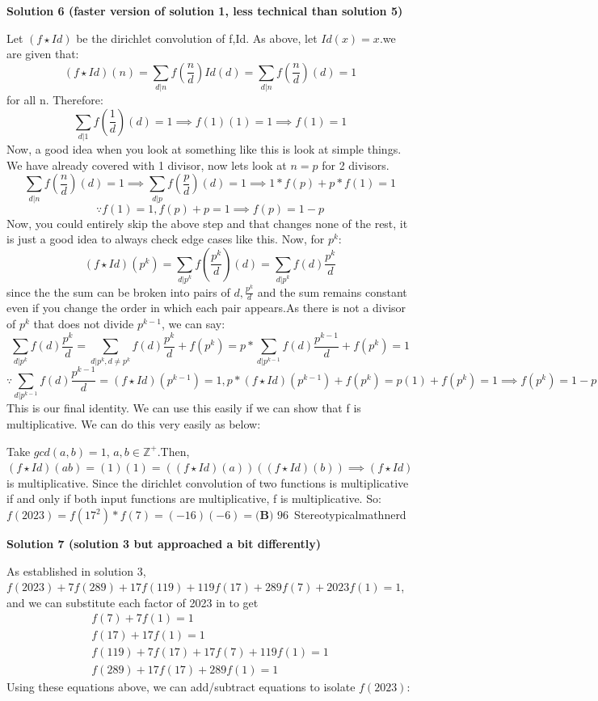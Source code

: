 \begin{enumerate}
\textbf{Solution 6 (faster version of solution 1, less technical than solution 5)}

Let $(f\star Id)$ be the dirichlet convolution of f,Id. As above, let $Id(x) = x$.we are given that:
 \[(f\star Id)(n) =\sum_{d|n}f(\frac{n}{d})Id(d)=\sum_{d|n}f(\frac{n}{d})(d)=1\] for all n. Therefore:
 \[\sum_{d|1}f(\frac{1}{d})(d)=1\implies f(1)(1)=1 \implies f(1) = 1\]Now, a good idea when you look at something like this is look at simple things. We have already covered with 1 divisor, now lets look at $n=p$ for 2 divisors.
 \[\sum_{d|n}f(\frac{n}{d})(d)=1\implies\sum_{d|p}f(\frac{p}{d})(d)=1\implies 1*f(p) + p * f(1)=1\]
 \[\because f(1)=1, f(p)+p=1\implies f(p)=1-p\]Now, you could entirely skip the above step and that changes none of the rest, it is just a good idea to always check edge cases like this. Now, for $p^k$:
 \[(f\star Id)(p^k) = \sum_{d|p^k}f(\frac{p^k}{d})(d)=\sum_{d|p^k}f(d)\frac{p^k}{d}\] since the the sum can be broken into pairs of $d,\frac{p^k}{d}$ and the sum remains constant even if you change the order in which each pair appears.As there is not a divisor of $p^k$ that does not divide $p^{k-1}$, we can say:  
 \[\sum_{d|p^k}f(d)\frac{p^k}{d}=\sum_{d|p^k,d\neq p^k}f(d)\frac{p^k}{d}+f(p^k)=p*\sum_{d|p^{k-1}}f(d)\frac{p^{k-1}}{d}+f(p^k)=1\]
 \[\because \sum_{d|p^{k-1}}f(d)\frac{p^{k-1}}{d}=(f\star Id)(p^{k-1})=1, p*(f\star Id)(p^{k-1})+f(p^k)=p(1)+f(p^k)=1\implies f(p^k)=1-p\] This is our final identity. We can use this easily if we can show that f is multiplicative. We can do this very easily as below:

 
Take $gcd(a,b)=1$, $a,b\in\mathbb{Z^+}$.Then, $(f\star Id)(ab) = (1)(1) = ((f\star Id)(a))((f\star Id)(b))\implies (f\star Id)$ is multiplicative. Since the dirichlet convolution of two  functions is multiplicative if and only if both input functions are multiplicative, f is multiplicative. So:$f(2023)= f(17^2)* f(7) = (-16)(-6) = \boxed{\textbf{(B) }} 96$~Stereotypicalmathnerd

 



\textbf{Solution 7 (solution 3 but approached a bit differently)}

As established in solution 3, $f(2023)+7f(289)+17f(119)+119f(17)+289f(7)+2023f(1)=1$, and we can substitute each factor of 2023 in to get\begin{align}f(7)+7f(1)=1\\f(17)+17f(1)=1\\f(119)+7f(17)+17f(7)+119f(1)=1\\f(289)+17f(17)+289f(1)=1\end{align}Using these equations above, we can add/subtract equations to isolate $f(2023)$:


\end{enumerate}
